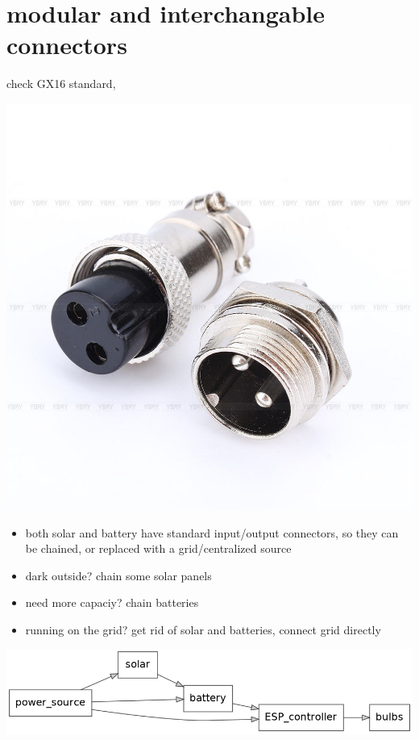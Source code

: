 \documentclass[11pt]{article}
\begin{document}
\section{modular and interchangable connectors}
\label{sec:org3ab14e8}
check GX16 standard,

\begin{center}
\includegraphics[width=.9\linewidth]{./samples/powerconnector1.jpg}
\end{center}

\begin{itemize}
\item both solar and battery have standard input/output connectors, so they can be chained, or replaced with a grid/centralized source
\item dark outside? chain some solar panels
\item need more capaciy? chain batteries
\item running on the grid? get rid of solar and batteries, connect grid directly
\end{itemize}

\begin{center}
\includegraphics[width=.9\linewidth]{simple1.png}
\end{center}
\end{document}
